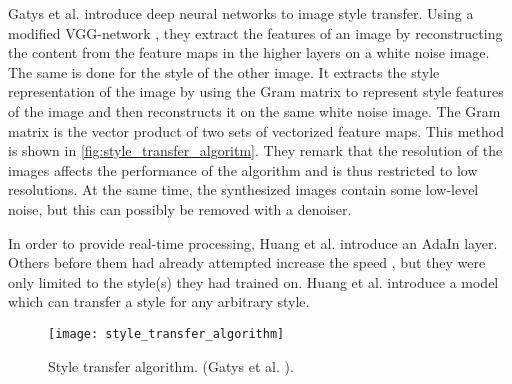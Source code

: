 Gatys et al. \cite{Gatys2016} introduce deep neural networks to image style transfer.
Using a modified VGG-network \cite{Simonyan2015}, they extract the features of an image by reconstructing the content from the feature maps in the higher layers on a white noise image.
The same is done for the style of the other image.
It extracts the style representation of the image by using the Gram matrix to represent style features of the image and then reconstructs it on the same white noise image.
The Gram matrix is the vector product of two sets of vectorized feature maps.
This method is shown in \ref{fig:style_transfer_algoritm}.
They remark that the resolution of the images affects the performance of the algorithm and is thus restricted to low resolutions.
At the same time, the synthesized images contain some low-level noise, but this can possibly be removed with a denoiser.

In order to provide real-time processing, Huang et al. \cite{Huang2017} introduce an \gls{AdaIn} layer.
Others before them had already attempted increase the speed \cite{Ulyanov2016}\cite{Li2016}, but they were only limited to the style(s) they had trained on.
Huang et al. introduce a model which can transfer a style for any arbitrary style.


\begin{figure}
	\centering
	\texttt{[image: style\_transfer\_algorithm]}%
	\caption{
		Style transfer algorithm. (Gatys et al. \cite{Gatys2015}).
	}
	\label{fig:style_transfer_algorithm}
\end{figure}
\label{sec:ist}